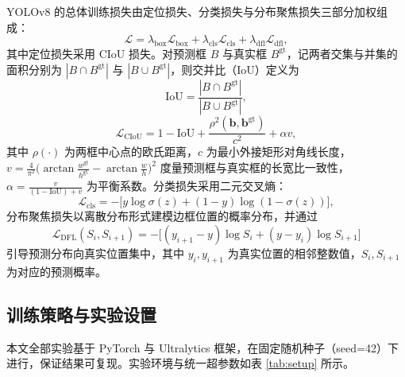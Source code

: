 YOLOv8 的总体训练损失由定位损失、分类损失与分布聚焦损失三部分加权组成：
\begin{equation}
  \mathcal{L} = \lambda_{\mathrm{box}}\mathcal{L}_{\mathrm{box}}
              + \lambda_{\mathrm{cls}}\mathcal{L}_{\mathrm{cls}}
              + \lambda_{\mathrm{dfl}}\mathcal{L}_{\mathrm{dfl}},
  \label{eq:total_loss}
\end{equation}
其中定位损失采用 CIoU 损失。对预测框 $B$ 与真实框 $B^{\mathrm{gt}}$，记两者交集与并集的面积分别为 $|B\cap B^{\mathrm{gt}}|$ 与 $|B\cup B^{\mathrm{gt}}|$，则交并比（IoU）\cite{lin2014coco}定义为
\begin{equation}
  \mathrm{IoU} = \frac{|B\cap B^{\mathrm{gt}}|}{|B\cup B^{\mathrm{gt}}|},
  \label{eq:iou}
\end{equation}
\begin{equation}
  \mathcal{L}_{\mathrm{CIoU}} = 1 - \mathrm{IoU}
  + \frac{\rho^{2}(\bm{b},\bm{b}^{\mathrm{gt}})}{c^{2}} + \alpha v,
  \label{eq:ciou}
\end{equation}
其中 $\rho(\cdot)$ 为两框中心点的欧氏距离，$c$ 为最小外接矩形对角线长度，
$v=\frac{4}{\pi^{2}}\bigl(\arctan\frac{w^{\mathrm{gt}}}{h^{\mathrm{gt}}}-\arctan\frac{w}{h}\bigr)^{2}$
度量预测框与真实框的长宽比一致性，$\alpha=\frac{v}{(1-\mathrm{IoU})+v}$ 为平衡系数\cite{zheng2020diou}。分类损失采用二元交叉熵：
\begin{equation}
  \mathcal{L}_{\mathrm{cls}} = -\bigl[y\log\sigma(z) + (1-y)\log(1-\sigma(z))\bigr],
  \label{eq:bce}
\end{equation}
分布聚焦损失以离散分布形式建模边框位置的概率分布\cite{li2020gfl}，并通过
\begin{equation}
  \mathcal{L}_{\mathrm{DFL}}(S_i,S_{i+1}) = -\bigl[(y_{i+1}-y)\log S_i + (y-y_i)\log S_{i+1}\bigr]
  \label{eq:dfl}
\end{equation}
引导预测分布向真实位置集中，其中 $y_i,y_{i+1}$ 为真实位置的相邻整数值，$S_i,S_{i+1}$ 为对应的预测概率。

\subsection{训练策略与实验设置}

本文全部实验基于 PyTorch 与 Ultralytics 框架，在固定随机种子（seed=42）下进行，保证结果可复现。实验环境与统一超参数如表 \ref{tab:setup} 所示。

